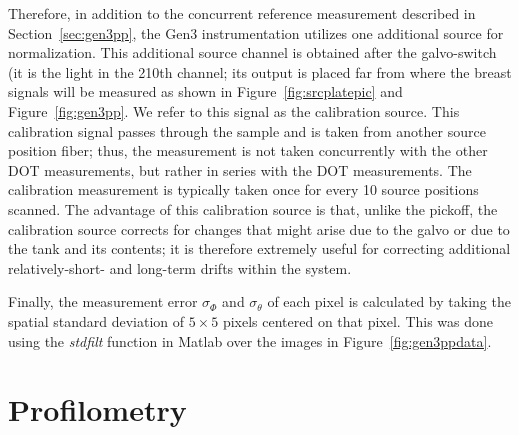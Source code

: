 Therefore, in addition to the concurrent reference measurement described in Section~\ref{sec:gen3pp}, the Gen3 instrumentation utilizes one additional source for normalization. This additional source channel is obtained after the galvo-switch (it is the light in the 210th channel; its output is placed far from where the breast signals will be measured as shown in Figure~\ref{fig:srcplatepic} and Figure~\ref{fig:gen3pp}. We refer to this signal as the calibration source. This calibration signal passes through the sample and is taken from another source position fiber; thus, the measurement is not taken concurrently with the other DOT measurements, but rather in series with the DOT measurements. The calibration measurement is typically taken once for every 10 source positions scanned. The advantage of this calibration source is that, unlike the pickoff, the calibration source corrects for changes that might arise due to the galvo or due to the tank and its contents; it is therefore extremely useful for correcting additional relatively-short- and long-term drifts within the system.

Finally, the measurement error $\sigma_{\Phi}$ and $\sigma_{\theta}$ of each pixel is calculated by taking the spatial standard deviation of $5\times 5$ pixels centered on that pixel. This was done using the \textit{stdfilt} function in Matlab over the images in Figure~\ref{fig:gen3ppdata}.

\section{Profilometry}
\label{sec:profilometry}
